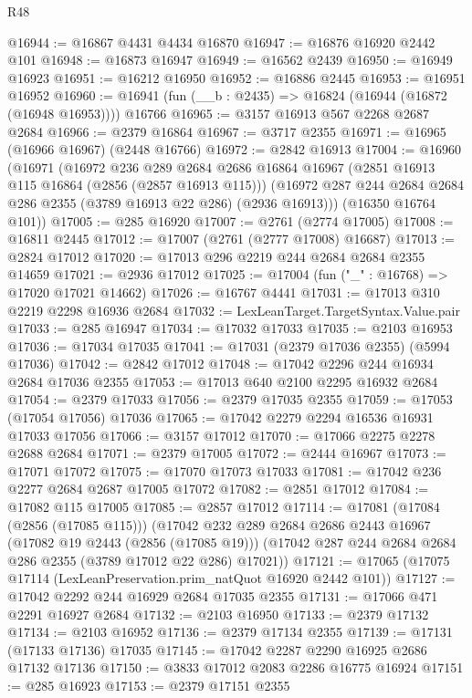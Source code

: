 \begin{lexlean}{R48}
\begin{coremodule}
@16944 := @16867 @4431 @4434 @16870
@16947 := @16876 @16920 @2442 @101
@16948 := @16873 @16947
@16949 := @16562 @2439
@16950 := @16949 @16923
@16951 := @16212 @16950
@16952 := @16886 @2445
@16953 := @16951 @16952
@16960 := @16941 (fun (__b : @2435) => @16824 (@16944 (@16872 (@16948 @16953)))) @16766
@16965 := @3157 @16913 @567 @2268 @2687 @2684
@16966 := @2379 @16864
@16967 := @3717 @2355
@16971 := @16965 (@16966 @16967) (@2448 @16766)
@16972 := @2842 @16913
@17004 := @16960
    (@16971
      (@16972
        @236
        @289
        @2684
        @2686
        @16864
        @16967
        (@2851 @16913 @115 @16864 (@2856 (@2857 @16913 @115)))
        (@16972 @287 @244 @2684 @2684 @286 @2355 (@3789 @16913 @22 @286) (@2936 @16913)))
      (@16350 @16764 @101))
@17005 := @285 @16920
@17007 := @2761 (@2774 @17005)
@17008 := @16811 @2445
@17012 := @17007 (@2761 (@2777 @17008) @16687)
@17013 := @2824 @17012
@17020 := @17013 @296 @2219 @244 @2684 @2684 @2355 @14659
@17021 := @2936 @17012
@17025 := @17004 (fun ("_" : @16768) => @17020 @17021 @14662)
@17026 := @16767 @4441
@17031 := @17013 @310 @2219 @2298 @16936 @2684
@17032 := LexLeanTarget.TargetSyntax.Value.pair
@17033 := @285 @16947
@17034 := @17032 @17033
@17035 := @2103 @16953
@17036 := @17034 @17035
@17041 := @17031 (@2379 @17036 @2355) (@5994 @17036)
@17042 := @2842 @17012
@17048 := @17042 @2296 @244 @16934 @2684 @17036 @2355
@17053 := @17013 @640 @2100 @2295 @16932 @2684
@17054 := @2379 @17033
@17056 := @2379 @17035 @2355
@17059 := @17053 (@17054 @17056) @17036
@17065 := @17042 @2279 @2294 @16536 @16931 @17033 @17056
@17066 := @3157 @17012
@17070 := @17066 @2275 @2278 @2688 @2684
@17071 := @2379 @17005
@17072 := @2444 @16967
@17073 := @17071 @17072
@17075 := @17070 @17073 @17033
@17081 := @17042 @236 @2277 @2684 @2687 @17005 @17072
@17082 := @2851 @17012
@17084 := @17082 @115 @17005
@17085 := @2857 @17012
@17114 := @17081
    (@17084 (@2856 (@17085 @115)))
    (@17042
      @232
      @289
      @2684
      @2686
      @2443
      @16967
      (@17082 @19 @2443 (@2856 (@17085 @19)))
      (@17042 @287 @244 @2684 @2684 @286 @2355 (@3789 @17012 @22 @286) @17021))
@17121 := @17065 (@17075 @17114 (LexLeanPreservation.prim_natQuot @16920 @2442 @101))
@17127 := @17042 @2292 @244 @16929 @2684 @17035 @2355
@17131 := @17066 @471 @2291 @16927 @2684
@17132 := @2103 @16950
@17133 := @2379 @17132
@17134 := @2103 @16952
@17136 := @2379 @17134 @2355
@17139 := @17131 (@17133 @17136) @17035
@17145 := @17042 @2287 @2290 @16925 @2686 @17132 @17136
@17150 := @3833 @17012 @2083 @2286 @16775 @16924
@17151 := @285 @16923
@17153 := @2379 @17151 @2355

\end{coremodule}
\end{lexlean}
